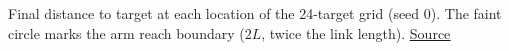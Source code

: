 Final distance to target at each location of the 24-target grid (seed 0). The faint circle marks the arm reach boundary ($2L$, twice the link length). \href{https://github.com/tahmidazam/gg4/blob/main/notebooks/cartesian_control_heatmap/cartesian_control_heatmap.ipynb}{\underline{Source}}%